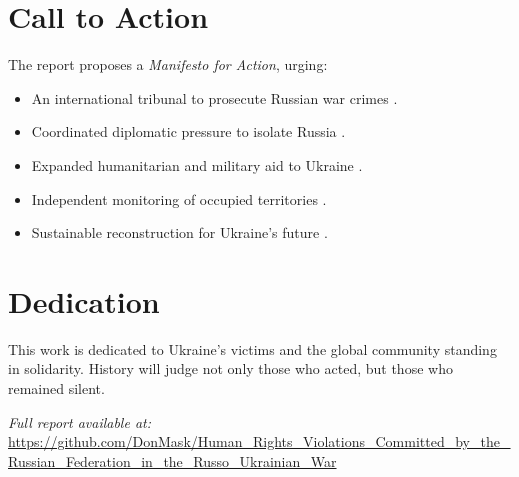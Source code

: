 \documentclass[a4paper,12pt]{article}
\begin{document}
\section*{Call to Action}
The report proposes a \textit{Manifesto for Action}, urging:
\begin{itemize}
    \item An international tribunal to prosecute Russian war crimes \cite{icc_2023}.
    \item Coordinated diplomatic pressure to isolate Russia \cite{un_charter}.
    \item Expanded humanitarian and military aid to Ukraine \cite{unhcr_2023}.
    \item Independent monitoring of occupied territories \cite{osce_2023}.
    \item Sustainable reconstruction for Ukraine’s future \cite{world_bank_2023, eco_impact_2023}.
\end{itemize}

\section*{Dedication}
This work is dedicated to Ukraine’s victims and the global community standing in solidarity. History will judge not only those who acted, but those who remained silent.

\vspace{0.5em}
\noindent \textit{Full report available at:} \\
\url{https://github.com/DonMask/Human_Rights_Violations_Committed_by_the_Russian_Federation_in_the_Russo_Ukrainian_War}

\printbibliography %
\end{document}
